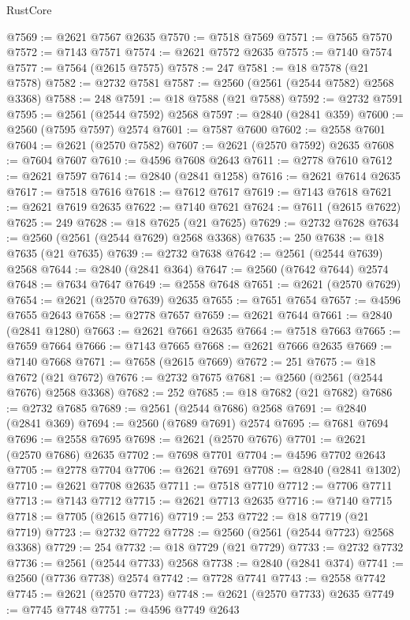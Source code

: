 \begin{lexlean}{RustCore}
\begin{coremodule}
@7569 := @2621 @7567 @2635
@7570 := @7518 @7569
@7571 := @7565 @7570
@7572 := @7143 @7571
@7574 := @2621 @7572 @2635
@7575 := @7140 @7574
@7577 := @7564 (@2615 @7575)
@7578 := 247
@7581 := @18 @7578 (@21 @7578)
@7582 := @2732 @7581
@7587 := @2560 (@2561 (@2544 @7582) @2568 @3368)
@7588 := 248
@7591 := @18 @7588 (@21 @7588)
@7592 := @2732 @7591
@7595 := @2561 (@2544 @7592) @2568
@7597 := @2840 (@2841 @359)
@7600 := @2560 (@7595 @7597) @2574
@7601 := @7587 @7600
@7602 := @2558 @7601
@7604 := @2621 (@2570 @7582)
@7607 := @2621 (@2570 @7592) @2635
@7608 := @7604 @7607
@7610 := @4596 @7608 @2643
@7611 := @2778 @7610
@7612 := @2621 @7597
@7614 := @2840 (@2841 @1258)
@7616 := @2621 @7614 @2635
@7617 := @7518 @7616
@7618 := @7612 @7617
@7619 := @7143 @7618
@7621 := @2621 @7619 @2635
@7622 := @7140 @7621
@7624 := @7611 (@2615 @7622)
@7625 := 249
@7628 := @18 @7625 (@21 @7625)
@7629 := @2732 @7628
@7634 := @2560 (@2561 (@2544 @7629) @2568 @3368)
@7635 := 250
@7638 := @18 @7635 (@21 @7635)
@7639 := @2732 @7638
@7642 := @2561 (@2544 @7639) @2568
@7644 := @2840 (@2841 @364)
@7647 := @2560 (@7642 @7644) @2574
@7648 := @7634 @7647
@7649 := @2558 @7648
@7651 := @2621 (@2570 @7629)
@7654 := @2621 (@2570 @7639) @2635
@7655 := @7651 @7654
@7657 := @4596 @7655 @2643
@7658 := @2778 @7657
@7659 := @2621 @7644
@7661 := @2840 (@2841 @1280)
@7663 := @2621 @7661 @2635
@7664 := @7518 @7663
@7665 := @7659 @7664
@7666 := @7143 @7665
@7668 := @2621 @7666 @2635
@7669 := @7140 @7668
@7671 := @7658 (@2615 @7669)
@7672 := 251
@7675 := @18 @7672 (@21 @7672)
@7676 := @2732 @7675
@7681 := @2560 (@2561 (@2544 @7676) @2568 @3368)
@7682 := 252
@7685 := @18 @7682 (@21 @7682)
@7686 := @2732 @7685
@7689 := @2561 (@2544 @7686) @2568
@7691 := @2840 (@2841 @369)
@7694 := @2560 (@7689 @7691) @2574
@7695 := @7681 @7694
@7696 := @2558 @7695
@7698 := @2621 (@2570 @7676)
@7701 := @2621 (@2570 @7686) @2635
@7702 := @7698 @7701
@7704 := @4596 @7702 @2643
@7705 := @2778 @7704
@7706 := @2621 @7691
@7708 := @2840 (@2841 @1302)
@7710 := @2621 @7708 @2635
@7711 := @7518 @7710
@7712 := @7706 @7711
@7713 := @7143 @7712
@7715 := @2621 @7713 @2635
@7716 := @7140 @7715
@7718 := @7705 (@2615 @7716)
@7719 := 253
@7722 := @18 @7719 (@21 @7719)
@7723 := @2732 @7722
@7728 := @2560 (@2561 (@2544 @7723) @2568 @3368)
@7729 := 254
@7732 := @18 @7729 (@21 @7729)
@7733 := @2732 @7732
@7736 := @2561 (@2544 @7733) @2568
@7738 := @2840 (@2841 @374)
@7741 := @2560 (@7736 @7738) @2574
@7742 := @7728 @7741
@7743 := @2558 @7742
@7745 := @2621 (@2570 @7723)
@7748 := @2621 (@2570 @7733) @2635
@7749 := @7745 @7748
@7751 := @4596 @7749 @2643

\end{coremodule}
\end{lexlean}
